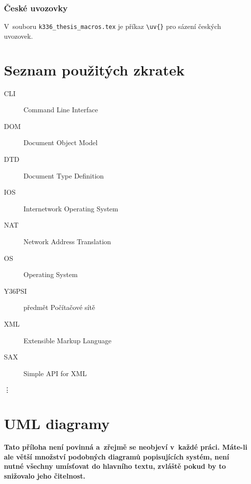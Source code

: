 \documentclass[11pt,twoside,a4paper]{book}
\begin{document}
\subsection{České uvozovky}
V~souboru \verb|k336_thesis_macros.tex| je příkaz \verb|\uv{}| pro sázení českých uvozovek. 


\chapter{Seznam použitých zkratek}

\begin{description}
\item[CLI] Command Line Interface
\item[DOM] Document Object Model
\item[DTD] Document Type Definition
\item[IOS] Internetwork Operating System
\item[NAT] Network Address Translation
\item[OS] Operating System
\item[Y36PSI] předmět Počítačové sítě
\item[XML] Extensible Markup Language

\item [SAX] Simple API for XML
\end{description}
\vdots

\chapter{UML diagramy}
\textbf{\large Tato příloha není povinná a~zřejmě se neobjeví v~každé práci. Máte-li ale větší množství podobných
diagramů popisujících systém, není nutné všechny umísťovat do hlavního textu, zvláště pokud by to snižovalo jeho
čitelnost.}
\end{document}
